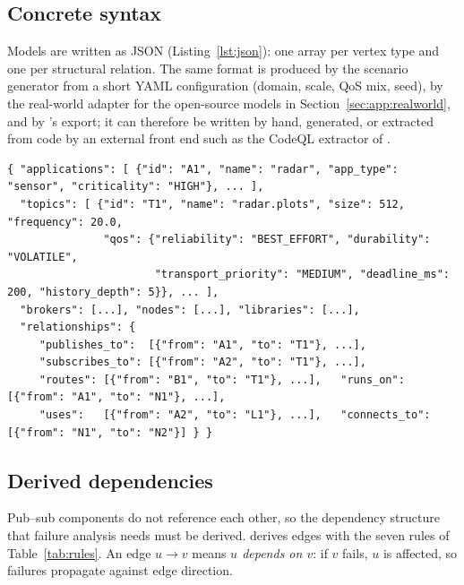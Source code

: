\subsection{Concrete syntax}
\label{sec:modeling:syntax}

Models are written as JSON (Listing~\ref{lst:json}): one array per vertex type and one per structural relation. The same format is produced by the scenario generator from a short YAML configuration (domain, scale, QoS mix, seed), by the real-world adapter for the open-source models in Section~\ref{sec:app:realworld}, and by 's export; it can therefore be written by hand, generated, or extracted from code by an external front end such as the CodeQL extractor of \citet{caliskan2026uyms}.

\begin{lstlisting}[caption={Excerpt of the mini-ATM model in \sag{}'s JSON concrete syntax.}, label={lst:json}]
{ "applications": [ {"id": "A1", "name": "radar", "app_type": "sensor", "criticality": "HIGH"}, ... ],
  "topics": [ {"id": "T1", "name": "radar.plots", "size": 512, "frequency": 20.0,
               "qos": {"reliability": "BEST_EFFORT", "durability": "VOLATILE",
                       "transport_priority": "MEDIUM", "deadline_ms": 200, "history_depth": 5}}, ... ],
  "brokers": [...], "nodes": [...], "libraries": [...],
  "relationships": {
     "publishes_to":  [{"from": "A1", "to": "T1"}, ...],
     "subscribes_to": [{"from": "A2", "to": "T1"}, ...],
     "routes": [{"from": "B1", "to": "T1"}, ...],   "runs_on": [{"from": "A1", "to": "N1"}, ...],
     "uses":   [{"from": "A2", "to": "L1"}, ...],   "connects_to": [{"from": "N1", "to": "N2"}] } }
\end{lstlisting}

\subsection{Derived dependencies}
\label{sec:modeling:rules}

Pub--sub components do not reference each other, so the dependency structure that failure analysis needs must be derived. \sag{} derives  edges with the seven rules of Table~\ref{tab:rules}. An edge $u \to v$ means \emph{$u$ depends on $v$}: if $v$ fails, $u$ is affected, so failures propagate against edge direction.

